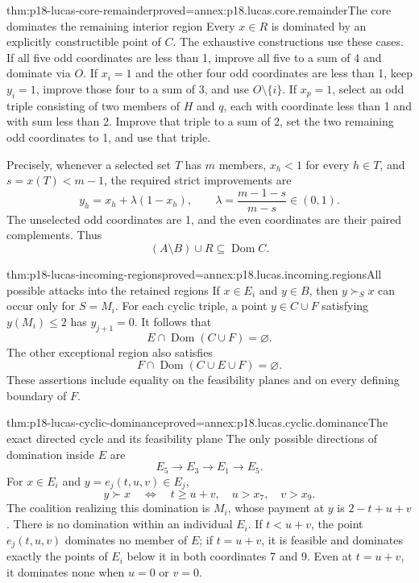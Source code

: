 \begin{hblemma}{thm:p18-lucas-core-remainder}{proved=annex:p18.lucas.core.remainder}{The core dominates the remaining interior region}
Every \(x\in R\) is dominated by an explicitly constructible
point of \(C\). The exhaustive constructions use these cases.
If all five odd coordinates are less than 1, improve all five
to a sum of 4 and dominate via \(O\). If \(x_i=1\) and the
other four odd coordinates are less than 1, keep \(y_i=1\),
improve those four to a sum of 3, and use \(O\setminus\{i\}\).
If \(x_p=1\), select an odd triple consisting of two members
of \(H\) and \(q\), each with coordinate less than 1 and with
sum less than 2. Improve that triple to a sum of 2, set the
two remaining odd coordinates to 1, and use that triple.

Precisely, whenever a selected set \(T\) has \(m\) members,
\(x_h<1\) for every \(h\in T\), and \(s=x(T)<m-1\), the required
strict improvements are
\[
 y_h=x_h+\lambda(1-x_h),\qquad
 \lambda=\frac{m-1-s}{m-s}\in(0,1).
\]
The unselected odd coordinates are 1, and the even coordinates
are their paired complements. Thus
\[
            (A\setminus B)\cup R\subseteq\operatorname{Dom}C.
\]
\end{hblemma}

\begin{hblemma}{thm:p18-lucas-incoming-regions}{proved=annex:p18.lucas.incoming.regions}{All possible attacks into the retained regions}
If \(x\in E_i\) and \(y\in B\), then \(y\succ_S x\) can occur
only for \(S=M_i\). For each cyclic triple, a point \(y\in C\cup F\)
satisfying \(y(M_i)\leq2\) has \(y_{j+1}=0\).
It follows that
\[
                         E\cap\operatorname{Dom}(C\cup F)=\varnothing.
\]
The other exceptional region also satisfies
\[
                         F\cap\operatorname{Dom}(C\cup E\cup F)=\varnothing.
\]
These assertions include equality on the feasibility planes
and on every defining boundary of \(F\).
\end{hblemma}

\begin{hblemma}{thm:p18-lucas-cyclic-dominance}{proved=annex:p18.lucas.cyclic.dominance}{The exact directed cycle and its feasibility plane}
The only possible directions of domination inside \(E\) are
\[
                     E_5\longrightarrow E_3\longrightarrow E_1
                                                \longrightarrow E_5.
\]
For \(x\in E_i\) and \(y=e_j(t,u,v)\in E_j\),
\[
             y\succ x
       \quad\Longleftrightarrow\quad
             t\geq u+v,\quad u>x_7,\quad v>x_9.
\]
The coalition realizing this domination is \(M_i\), whose
payment at \(y\) is \(2-t+u+v\).
There is no domination within an individual \(E_i\).
If \(t<u+v\), the point \(e_j(t,u,v)\) dominates no member of
\(E\); if \(t=u+v\), it is feasible and dominates exactly the
points of \(E_i\) below it in both coordinates 7 and 9.
Even at \(t=u+v\), it dominates none when \(u=0\) or \(v=0\).
\end{hblemma}

